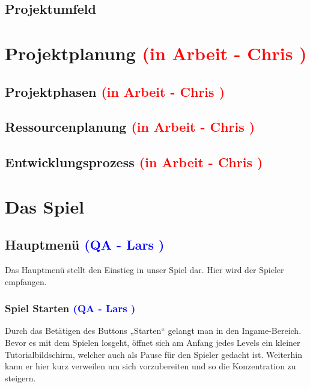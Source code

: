 \documentclass[12pt]{article}
\begin{document}
\subsection{Projektumfeld}


\newpage
\section{Projektplanung \textcolor{red}{(in Arbeit - Chris )}}


\vspace{2cm}
\subsection{Projektphasen  \textcolor{red}{(in Arbeit - Chris )}}

\vspace{2cm}
\subsection{Ressourcenplanung  \textcolor{red}{(in Arbeit - Chris )}}

\vspace{2cm}
\subsection{Entwicklungsprozess  \textcolor{red}{(in Arbeit - Chris )}}

\newpage
\section{Das Spiel}

\vspace{2cm}
\subsection{Hauptmenü \textcolor{blue}{(QA - Lars )}}

Das Hauptmenü stellt den Einstieg in unser Spiel dar. Hier wird der Spieler empfangen.

\vspace{1cm}
\subsubsection{Spiel Starten \textcolor{blue}{(QA - Lars )}}

Durch das Betätigen des Buttons „Starten“ gelangt man in den Ingame-Bereich. Bevor es mit dem Spielen losgeht, öffnet sich am Anfang jedes
Levels ein kleiner Tutorialbildschirm, welcher auch als Pause für den Spieler gedacht ist. Weiterhin kann er hier kurz verweilen um sich vorzubereiten
und so die Konzentration zu steigern.
\end{document}
